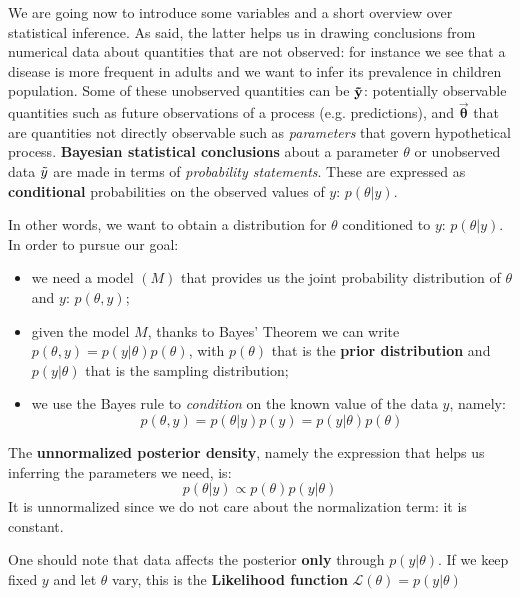\documentclass[../main/main.tex]{subfiles}
\begin{document}
We are going now to introduce some variables and a short overview over statistical inference. As said, the latter helps us in drawing conclusions from numerical data about quantities that are not observed: for instance we see that a disease is more frequent in adults and we want to infer its prevalence in children population. Some of these unobserved quantities can be $\mathbf{\Tilde{y}}$: potentially observable quantities such as future observations of a process (e.g. predictions), and $\mathbf{\vec{\theta}}$ that are quantities not directly observable such as \textit{parameters} that govern hypothetical process. \textbf{Bayesian statistical conclusions} about a parameter $\theta$ or unobserved data $\Tilde{y}$ are made in terms of \textit{probability statements}. These are expressed as \textbf{conditional} probabilities on the observed values of $y$: $p(\theta|y)$.

In other words, we want to obtain a distribution for $\theta$ conditioned to $y$: $p(\theta|y)$. In order to pursue our goal:
\begin{itemize}
    \item we need a model $(M)$ that provides us the joint probability distribution of $\theta$ and $y$: $p(\theta, y)$;
    \item given the model $M$, thanks to Bayes' Theorem we can write $p(\theta,y) = p(y|\theta)p(\theta)$, with $p(\theta)$ that is the \textbf{prior distribution} and $p(y|\theta)$ that is the sampling distribution;
    \item we use the Bayes rule to \textit{condition} on the known value of the data $y$, namely:
    \begin{equation*}
        p(\theta,y) = p(\theta|y)p(y) = p(y|\theta)p(\theta)
    \end{equation*}
\end{itemize}
The \textbf{unnormalized posterior density}, namely the expression that helps us inferring the parameters we need, is:
\begin{equation}
    p(\theta|y) \propto p(\theta) p(y|\theta)
\end{equation}
It is unnormalized since we do not care about the normalization term: it is constant.

One should note that data affects the posterior \textbf{only} through $p(y|\theta)$. If we keep fixed $y$ and let $\theta$ vary, this is the \textbf{Likelihood function} $\mathcal{L}(\theta) = p(y|\theta)$
\end{document}
